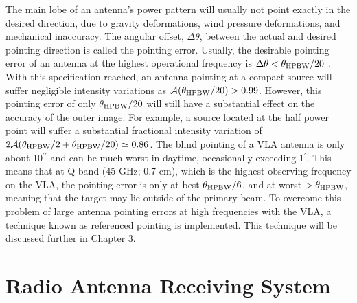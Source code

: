 The main lobe of an antenna's power pattern will usually not point exactly in the desired direction, due to gravity deformations, wind pressure deformations, and mechanical inaccuracy. The angular offset, $\Delta \theta$, between the actual and desired pointing direction is called the pointing error. Usually, the desirable pointing error of  an antenna at the highest operational frequency is $\Delta \theta < \theta _{\rm{HPBW}}/20$ \citep{taylor_1999}. With this specification reached, an antenna pointing at a compact source will suffer negligible intensity variations as $\mathcal{A}(\theta _{\rm{HPBW}}/20) > 0.99$. However, this pointing error of only $\theta _{\rm{HPBW}}/20$ will still have a substantial effect on the accuracy of the outer image. For example, a source located at the half power point will suffer a substantial fractional intensity variation of $2\mathcal{A}(\theta _{\rm{HPBW}}/2+\theta _{\rm{HPBW}}/20) \simeq 0.86$. The blind pointing of a VLA antenna is only about 10$^{\prime\prime}$ and can be much worst in daytime, occasionally exceeding 1$^{\prime}$. This means that at Q-band (45 GHz; 0.7 cm), which is the highest observing frequency on the VLA, the pointing error is only at best $\theta _{\rm{HPBW}}/6$, and at worst $>\theta _{\rm{HPBW}}$, meaning that the target may lie outside of the primary beam. To overcome this problem of large antenna pointing errors at high frequencies with the VLA, a technique known as referenced pointing is implemented. This technique will be discussed further in Chapter 3. 

\section{Radio Antenna Receiving System}\label{sec:2.2}

